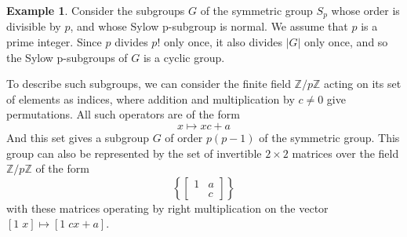 \documentclass[12pt]{article}
\theoremstyle{definition}
\newtheorem{eg}[thm]{Example}
\theoremstyle{remark}
\numberwithin{equation}{section}
\newcommand\Z{\mathbb Z}    %
\begin{document}
\vspace{15pt}

\begin{eg}
        Consider the subgroups $G$ of the symmetric group $S_p$ whose order is divisible by $p$, and whose Sylow p-subgroup is normal. We assume that $p$ is a prime integer. Since $p$ divides $p!$ only once, it also divides $|G|$ only once, and so the Sylow p-subgroups of $G$ is a cyclic group.

        To describe such subgroups, we can consider the finite field $\Z/p\Z$ acting on its set of elements as indices, where addition and multiplication by $c\neq 0$ give permutations. All such operators are of the form \begin{equation}
                x \mapsto xc + a
        \end{equation}
        And this set gives a subgroup $G$ of order $p(p-1)$ of the symmetric group. This group can also be represented by the set of invertible $2\times 2$ matrices over the field $\Z/p\Z$ of the form \begin{equation}
                \left\{\begin{bmatrix} 1 & a \\ & c \end{bmatrix}\right\}
        \end{equation}
        with these matrices operating by right multiplication on the vector $[1 \; x]\mapsto [1 \; cx+a]$.
\end{eg}



\vspace{15pt}
\end{document}
